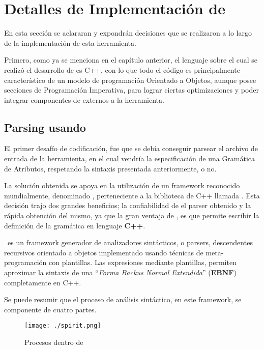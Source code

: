 \chapter{Detalles de Implementación de \maggen}
\label{chap:implem}
\minitoc

En esta sección se aclararan y expondrán decisiones que se realizaron a lo largo de la implementación de esta herramienta.

Primero, como ya se menciona en el capítulo anterior, el lenguaje sobre el cual se realizó el desarrollo de \maggen es C++, con lo que todo el código es principalmente característico de un modelo de programación Orientado a Objetos, aunque posee secciones de Programación Imperativa, para lograr ciertas optimizaciones y poder integrar componentes de externos a la herramienta.

\section{Parsing usando \boost\ \spirit}

El primer desafío de codificación, fue que se debía conseguir parsear el archivo de entrada de la herramienta, en el cual vendría la especificación de una Gramática de Atributos, respetando la sintaxis presentada anteriormente, o no.

La solución obtenida se apoya en la utilización de un framework reconocido mundialmente, denominado \spirit, perteneciente a la biblioteca de C++ llamada \boost. Esta decisión trajo dos grandes beneficios; la confiabilidad de el parser obtenido y la rápida obtención del mismo, ya que la gran ventaja de \spirit, es que permite escribir la definición de la gramática en lenguaje \textbf{C++}.

\spirit\ es un framework generador de analizadores sintácticos, o parsers, descendentes recursivos orientado a objetos implementado usando técnicas de meta-programación con plantillas. Las expresiones mediante plantillas, permiten aproximar la sintaxis de una ``\textit{\textit{Forma Backus Normal Extendida}}'' (\textbf{EBNF}) completamente en C++.

Se puede resumir que el proceso de análisis sintáctico, en este framework, se componente de cuatro partes.

\begin{figure}\centering
\texttt{[image: ./spirit.png]}
\caption{Procesos dentro de \spirit}\label{procesoSpirit}
\end{figure}

